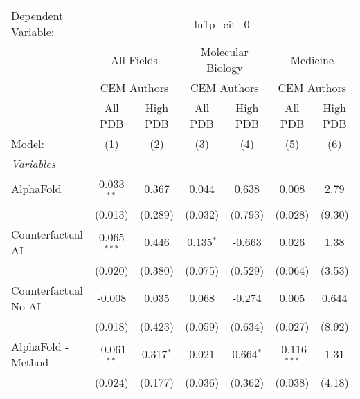 \begingroup
\centering
\begin{tabular}{lcccccc}
   \tabularnewline \midrule \midrule
   Dependent Variable: & \multicolumn{6}{c}{ln1p\_cit\_0}\\
 & \multicolumn{2}{c}{All Fields} & \multicolumn{2}{c}{Molecular Biology} & \multicolumn{2}{c}{Medicine} \\
\cmidrule(lr){2-3} \cmidrule(lr){4-5} \cmidrule(lr){6-7}
 & \multicolumn{2}{c}{CEM Authors} & \multicolumn{2}{c}{CEM Authors} & \multicolumn{2}{c}{CEM Authors} \\
\cmidrule(lr){2-3} \cmidrule(lr){4-5} \cmidrule(lr){6-7}
 & \multicolumn{1}{c}{All PDB} & \multicolumn{1}{c}{High PDB} & \multicolumn{1}{c}{All PDB} & \multicolumn{1}{c}{High PDB} & \multicolumn{1}{c}{All PDB} & \multicolumn{1}{c}{High PDB} \\
\cmidrule(lr){2-2} \cmidrule(lr){3-3} \cmidrule(lr){4-4} \cmidrule(lr){5-5} \cmidrule(lr){6-6} \cmidrule(lr){7-7}
   Model:                                                     & (1)           & (2)           & (3)           & (4)         & (5)            & (6)\\  
   \midrule
   \emph{Variables}\\
   AlphaFold                                                  & 0.033$^{**}$  & 0.367         & 0.044         & 0.638       & 0.008          & 2.79\\   
                                                              & (0.013)       & (0.289)       & (0.032)       & (0.793)     & (0.028)        & (9.30)\\   
   Counterfactual AI                                          & 0.065$^{***}$ & 0.446         & 0.135$^{*}$   & -0.663      & 0.026          & 1.38\\   
                                                              & (0.020)       & (0.380)       & (0.075)       & (0.529)     & (0.064)        & (3.53)\\   
   Counterfactual No AI                                       & -0.008        & 0.035         & 0.068         & -0.274      & 0.005          & 0.644\\   
                                                              & (0.018)       & (0.423)       & (0.059)       & (0.634)     & (0.027)        & (8.92)\\   
   AlphaFold - Method                                         & -0.061$^{**}$ & 0.317$^{*}$   & 0.021         & 0.664$^{*}$ & -0.116$^{***}$ & 1.31\\   
                                                              & (0.024)       & (0.177)       & (0.036)       & (0.362)     & (0.038)        & (4.18)\\   

\end{tabular}

